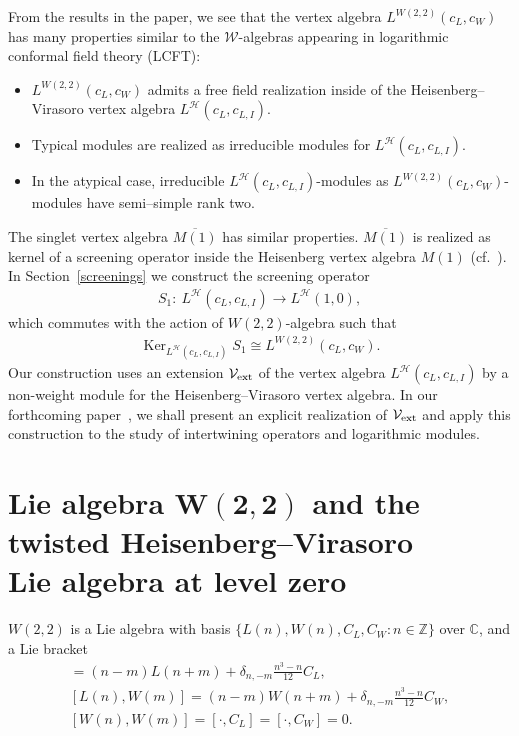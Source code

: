 \documentclass[pdftex]{sigma}
\numberwithin{equation}{section}
\newcommand{\C}{\mathbb C}
\newcommand{\HVir}{\mathcal H}
\DeclareMathOperator{\Ker}{Ker}
\begin{document}
From the results in the paper, we see that the vertex algebra $L ^{W(2,2)} (c_L, c_W )$ has many properties similar to the $\mathcal W$-algebras appearing in logarithmic conformal f\/ield theory (LCFT):
\begin{itemize}\itemsep=0pt
\item $L ^{W(2,2)} (c_L, c_W )$ admits a free f\/ield realization inside of the Heisenberg--Virasoro vertex algebra $L^{\HVir} (c_L, c_{L,I})$.
\item Typical modules are realized as irreducible modules for $L^{\HVir} (c_L, c_{L,I})$.
\item In the atypical case, irreducible $L^{\HVir} (c_L, c_{L,I})$-modules as $L ^{W(2,2)} (c_L, c_W )$-modules have semi--simple rank two.
 \end{itemize}
The singlet vertex algebra $\overline{M(1)}$ has similar properties. $\overline{M(1)}$ is realized as kernel of a screening operator inside the Heisenberg vertex algebra $M(1)$ (cf.~\cite{A1}). In Section~\ref{screenings} we construct the screening operator
\begin{gather*}
S _1\colon \ L^ {\HVir} (c_L, c_{L,I} ) \rightarrow L^{\HVir} (1,0),
\end{gather*}
which commutes with the action of $W(2,2)$-algebra such that
\begin{gather*}
\Ker_ { L^{\HVir} (c_L,c_{L,I}) } S_1 \cong L ^{W(2,2)} (c_L, c_W ) .
\end{gather*}
Our construction uses an extension $\mathcal V_{\rm ext}$ of the vertex algebra $L^ {\HVir} (c_L, c_{L,I} )$ by a non-weight module for the Heisenberg--Virasoro vertex algebra. In our forthcoming paper~\cite{AR2}, we shall present an explicit realization of $\mathcal V_{\rm ext}$ and apply this construction to the study of intertwining operators and logarithmic modules.

\section[Lie algebra $W(2,2)$ and the twisted Heisenberg--Virasoro Lie algebra at level zero]{Lie algebra $\boldsymbol{W(2,2)}$ and the twisted Heisenberg--Virasoro\\ Lie algebra at level zero}\label{rep-th-review}
$W(2,2)$ is a Lie algebra with basis $\{L(n), W(n),C_{L},C_{W}\colon n\in\mathbb{Z\}}$ over $\C$, and a Lie bracket
\begin{gather*}
[ L(n) ,L(m) ] =(n-m) L(n+m) +\delta_{n,-m}\frac{n^{3}-n}{12}C_{L}, \\ %
[ L(n) ,W(m) ] =(n-m)W(n+m) +\delta_{n,-m}\frac{n^{3}-n}{12}C_{W}, \\
[ W(n) ,W(m) ] =[ \cdot,C_{L}] =[ \cdot,C_{W}] =0.
\end{gather*}
\end{document}
